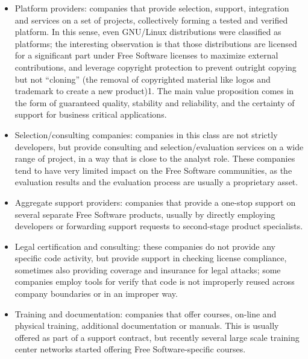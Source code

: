 \begin{itemize}
 \item Platform providers: companies that provide selection, support, integration and services on a set of projects, collectively forming a tested and verified platform. In this sense, even GNU/Linux distributions were classified as platforms; the interesting observation is that those distributions are licensed for a significant part under Free Software licenses to maximize external contributions, and leverage copyright protection to prevent outright copying but not “cloning” (the removal of copyrighted material like logos and trademark to create a new product)1. The main value proposition comes in the form of guaranteed quality, stability and reliability, and the certainty of support for business critical applications.
 \item Selection/consulting companies: companies in this class are not strictly developers, but provide consulting and selection/evaluation services on a wide range of project, in a way that is close to the analyst role. These companies tend to have very limited impact on the Free Software communities, as the evaluation results and the evaluation process are usually a proprietary asset.
 \item Aggregate support providers: companies that provide a one-stop support on several separate Free Software products, usually by directly employing developers or forwarding support requests to second-stage product specialists.
 \item Legal certification and consulting: these companies do not provide any specific code activity, but provide support in checking license compliance, sometimes also providing coverage and insurance for legal attacks; some companies employ tools for verify that code is not improperly reused across company boundaries or in an improper way.
 \item Training and documentation: companies that offer courses, on-line and physical training, additional documentation or manuals. This is usually offered as part of a support contract, but recently several large scale training center networks started offering Free Software-specific courses.

\end{itemize}
